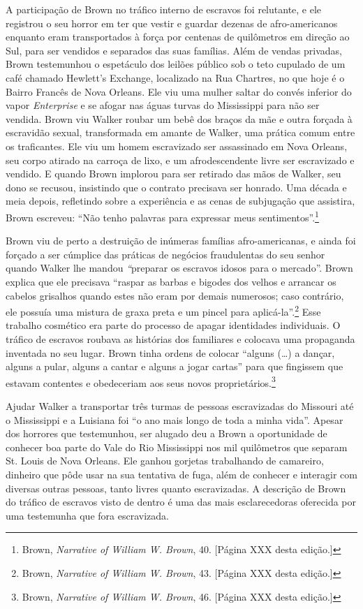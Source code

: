 A participação de Brown no tráfico interno de escravos foi relutante, e
ele registrou o seu horror em ter que vestir e guardar dezenas de
afro-americanos enquanto eram transportados à força por centenas de
quilômetros em direção ao Sul, para ser vendidos e separados das suas
famílias. Além de vendas privadas, Brown testemunhou o espetáculo dos
leilões público sob o teto cupulado de um café chamado Hewlett's
Exchange, localizado na Rua Chartres, no que hoje é o Bairro Francês de
Nova Orleans. Ele viu uma mulher saltar do convés inferior do vapor
\emph{Enterprise} e se afogar nas águas turvas do Mississippi para não
ser vendida. Brown viu Walker roubar um bebê dos braços da mãe e outra
forçada à escravidão sexual, transformada em amante de Walker, uma
prática comum entre os traficantes. Ele viu um homem escravizado ser
assassinado em Nova Orleans, seu corpo atirado na carroça de lixo, e um
afrodescendente livre ser escravizado e vendido. E quando Brown implorou
para ser retirado das mãos de Walker, seu dono se recusou, insistindo
que o contrato precisava ser honrado. Uma década e meia depois,
refletindo sobre a experiência e as cenas de subjugação que assistira,
Brown escreveu: ``Não tenho palavras para expressar meus
sentimentos''.\footnote{Brown, \emph{Narrative of William W. Brown}, 40.
  {[}Página XXX desta edição.{]}}

Brown viu de perto a destruição de inúmeras famílias afro-americanas, e
ainda foi forçado a ser cúmplice das práticas de negócios fraudulentas
do seu senhor quando Walker lhe mandou \emph{``}preparar os escravos
idosos para o mercado''. Brown explica que ele precisava ``raspar as
barbas e bigodes dos velhos e arrancar os cabelos grisalhos quando estes
não eram por demais numerosos; caso contrário, ele possuía uma mistura
de graxa preta e um pincel para aplicá-la''.\footnote{Brown,
  \emph{Narrative of William W. Brown}, 43. {[}Página XXX desta
  edição.{]}} Esse trabalho cosmético era parte do processo de apagar
identidades individuais. O tráfico de escravos roubava as histórias dos
familiares e colocava uma propaganda inventada no seu lugar. Brown tinha
ordens de colocar ``alguns (\ldots{}) a dançar, alguns a pular, alguns a
cantar e alguns a jogar cartas'' para que fingissem que estavam
contentes e obedeceriam aos seus novos proprietários.\footnote{Brown,
  \emph{Narrative of William W. Brown}, 46. {[}Página XXX desta
  edição.{]}}

Ajudar Walker a transportar três turmas de pessoas escravizadas do
Missouri até o Mississippi e a Luisiana foi ``o ano mais longo de toda a
minha vida''. Apesar dos horrores que testemunhou, ser alugado deu a
Brown a oportunidade de conhecer boa parte do Vale do Rio Mississippi
nos mil quilômetros que separam St. Louis de Nova Orleans. Ele ganhou
gorjetas trabalhando de camareiro, dinheiro que pôde usar na sua
tentativa de fuga, além de conhecer e interagir com diversas outras
pessoas, tanto livres quanto escravizadas. A descrição de Brown do
tráfico de escravos visto de dentro é uma das mais esclarecedoras
oferecida por uma testemunha que fora escravizada.

